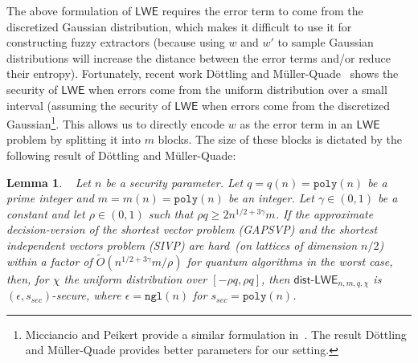 \documentclass[11pt]{article}
\newcommand{\class}[1]{{\ensuremath{\mathsf{#1}}}}
\newcommand{\rep}{\ensuremath{\class{Rep}}\xspace}
\newcommand{\vect}[1]{\ensuremath{\textbf{#1}}}
\newcommand{\poly}{\ensuremath{\mathtt{poly}}\xspace}
\newcommand{\ngl}{\ensuremath{\mathtt{ngl}}\xspace}
\newcommand{\LWE}{\class{LWE}}
\newcommand{\distLWE}{\ensuremath{\class{dist\mbox{-}LWE}}}
\newtheorem{lemma}[theorem]{Lemma}
\newcommand{\vA}{\vect{A}}
\begin{document}
The above formulation of $\LWE$ requires the error term to come from the discretized Gaussian distribution, which makes it difficult to use it for constructing fuzzy extractors (because using $w$ and $w'$ to sample Gaussian distributions will increase the distance between the error terms and/or reduce their entropy).
Fortunately, recent work D\"{o}ttling and M\"{u}ller-Quade~\cite{dottling2012} shows the security of $\LWE$ when errors come from the uniform distribution over a small interval (assuming the security of $\LWE$ when errors come from the discretized Gaussian\footnote{Micciancio and Peikert provide a similar formulation in~\cite{micciancio2013hardness}.  The result D\"{o}ttling and M\"{u}ller-Quade provides better parameters for our setting.}.  This allows us to directly encode $w$ as the error term in an $\LWE$ problem by splitting it  into $m$ blocks.  The size of these blocks is dictated by the following result of D\"{o}ttling and M\"{u}ller-Quade:

\begin{lemma}~
\label{lem:uniform LWE decision}
Let $n$ be a security parameter.  Let $q = q(n) = \poly(n)$ be a prime integer and $m = m(n) = \poly(n)$ be an integer. Let $\gamma\in (0, 1)$ be a constant and let $\rho\in (0,1)$ such that $\rho q \geq 2n^{1/2+3\gamma}m$. If the approximate decision-version of the shortest vector problem (GAPSVP) and the shortest independent vectors problem (SIVP) are hard~(on lattices of dimension $n/2$) within a factor of $\tilde{O}(n^{1/2+3\gamma}m/\rho)$ for quantum algorithms in the worst case, then, for $\chi$ the uniform distribution over $[-\rho q, \rho q]$, then $\distLWE_{n, m, q, \chi}$ is $(\epsilon, s_{sec})\mbox{-}$secure, where $\epsilon = \ngl(n)$ for $s_{sec}=\poly(n)$.
\end{lemma}
\end{document}
